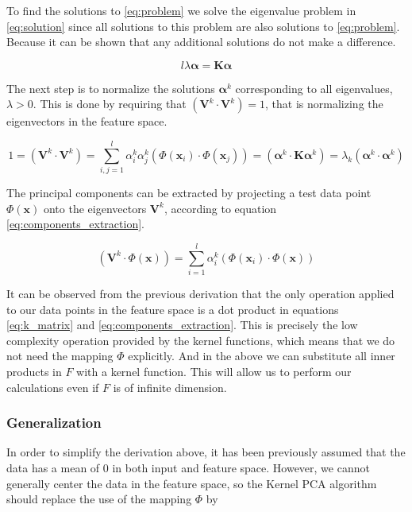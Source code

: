 To find the solutions to \eqref{eq:problem} we solve the eigenvalue problem in \eqref{eq:solution} since all solutions to this problem are also solutions to \eqref{eq:problem}. Because it can be shown that any additional  solutions do not make a difference.

\begin{equation} \label{eq:solution}
l \lambda \boldsymbol{\alpha} = \textbf{K} \boldsymbol{\alpha}
\end{equation}

The next step is to normalize the solutions $\boldsymbol{\alpha}^k$ corresponding to all eigenvalues, $\lambda > 0$. This is done by requiring that $(\textbf{V}^k\cdot \textbf{V}^k)=1$, that is normalizing the eigenvectors in the feature space.

\begin{equation} \label{eq:alpha_coeff}
1 = (\textbf{V}^k \cdot \textbf{V}^k) = \sum\limits_{i,j=1}^{l} \alpha_i^k \alpha_j^k (\Phi(\textbf{x}_i) \cdot \Phi(\textbf{x}_j)) =  (\boldsymbol{\alpha}^k \cdot \textbf{K} \boldsymbol{\alpha}^k) =  \lambda_k (\boldsymbol{\alpha}^k \cdot \boldsymbol{\alpha}^k)
\end{equation}

The principal components can be extracted by projecting a test data point $\Phi(\textbf{x})$ onto the eigenvectors $\textbf{V}^k$, according to equation \eqref{eq:components_extraction}.

\begin{equation} \label{eq:components_extraction}
(\textbf{V}^k \cdot \Phi(\textbf{x})) =  \sum\limits_{i=1}^{l} \alpha_i^k (\Phi(\textbf{x}_i) \cdot \Phi(\textbf{x}))
\end{equation}

It can be observed from the previous derivation that the only operation applied to our data points in the feature space is a dot product in equations \eqref{eq:k_matrix} and
\eqref{eq:components_extraction}. This is precisely the low complexity operation provided by the kernel functions, which means that we do not need the mapping $\Phi$ explicitly. And in the above we can substitute all inner products in $F$ with a kernel function. This will allow us to perform our calculations even if $F$ is of infinite dimension.


\subsubsection{Generalization}
In order to simplify the derivation above, it has been previously assumed that the data has a mean of 0 in both input and feature space. However, we cannot generally center the data in the feature space, so the Kernel PCA algorithm should replace the use of the mapping $\Phi$ by

